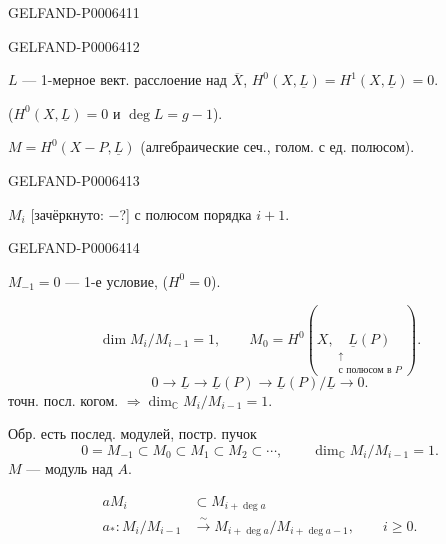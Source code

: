 \begin{GelfandAdjacentEvidence}{GELFAND-P000641}{1}
\end{GelfandAdjacentEvidence}
\begin{GelfandAdjacentEvidence}{GELFAND-P000641}{2}


\(L\) --- 1-мерное вект. расслоение над \(\overline X\),
\(H^0(X,\underline L)=H^1(X,\underline L)=0\).

(\(H^0(X,\underline L)=0\) и \(\operatorname{deg}L=g-1\)).

\(M=H^0(X-P,\underline L)\) (алгебраические сеч.,
голом. с ед. полюсом).
\end{GelfandAdjacentEvidence}
\begin{GelfandAdjacentEvidence}{GELFAND-P000641}{3}


\(M_i\) [зачёркнуто: \(-\)?] с полюсом порядка \(i+1\).
\end{GelfandAdjacentEvidence}
\begin{GelfandAdjacentEvidence}{GELFAND-P000641}{4}


\(M_{-1}=0\) --- 1-е условие, (\(H^0=0\)).

\[
\dim M_i/M_{i-1}=1,\qquad
M_0=H^0(X,\underset{\substack{\uparrow\\\text{с полюсом в }P}}{\underline L(P)}).
\]
\[
0\to\underline L\to\underline L(P)\to\underline L(P)/\underline L\to0.
\]
точн. посл. когом. \(\Rightarrow\dim_{\mathbb C}M_i/M_{i-1}=1\).

\begin{center}\shortstack{\textemdash\\[-.35em]\textemdash}\end{center}

Обр. есть послед. модулей, постр. пучок
\[
0=M_{-1}\subset M_0\subset M_1\subset M_2\subset\cdots,\qquad
\dim_{\mathbb C}M_i/M_{i-1}=1.
\]
\(M\) --- модуль над \(A\).

\[
\begin{aligned}
aM_i&\subset M_{i+\operatorname{deg}a}\\
a_*:M_i/M_{i-1}&\overset{\sim}{\to}
M_{i+\operatorname{deg}a}/M_{i+\operatorname{deg}a-1},\qquad i\geqslant0.
\end{aligned}
\]
\end{GelfandAdjacentEvidence}
